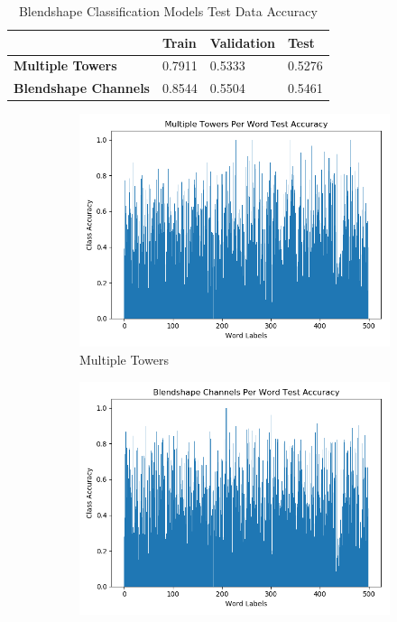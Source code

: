 \begin{table}[h!]
\centering
    \begin{tabular}{l | l | l | l }
    & \textbf{Train} & \textbf{Validation} & \textbf{Test} \\ \hline
    \textbf{Multiple Towers} & 0.7911 & 0.5333 & 0.5276 \\
    \textbf{Blendshape Channels} & 0.8544 & 0.5504 & 0.5461 \\
    \end{tabular} 
    \caption{Blendshape Classification Models Test Data Accuracy}
\end{table}\label{table:classification_test_accuracy}

\begin{figure}[h!]
    \centering
    \begin{subfigure}[b]{0.49\textwidth}
        \includegraphics[width=\textwidth]{figures/classification/blendshape_multi_tower_class_acc.png}
        \caption{Multiple Towers}\label{fig:multiple_towers_word_acc}
    \end{subfigure}
    \begin{subfigure}[b]{0.49\textwidth}
        \includegraphics[width=\textwidth]{figures/classification/blendshape_channel_class_acc.png}

\end{subfigure}
\end{figure}
